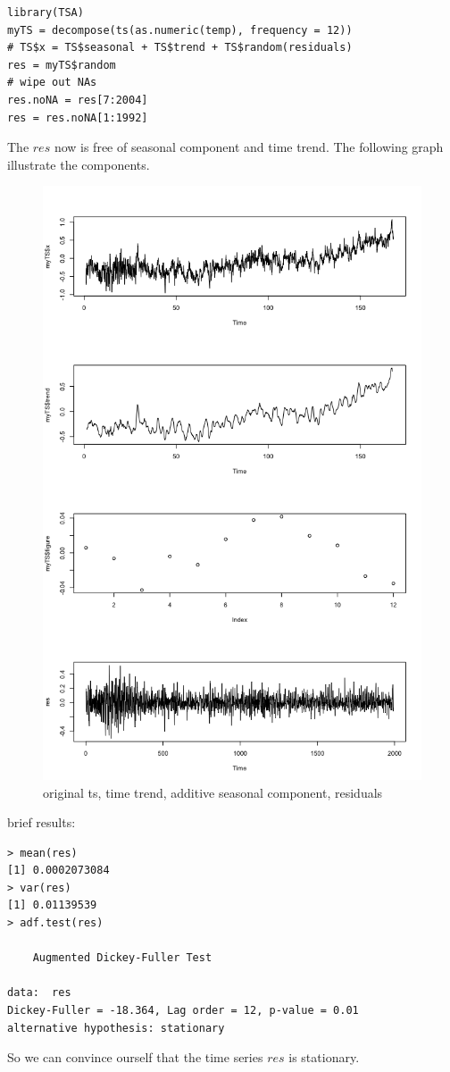 \documentclass[a4paper, 11pt]{article}
\begin{document}
\begin{verbatim}
library(TSA)
myTS = decompose(ts(as.numeric(temp), frequency = 12))
# TS$x = TS$seasonal + TS$trend + TS$random(residuals) 
res = myTS$random
# wipe out NAs
res.noNA = res[7:2004] 
res = res.noNA[1:1992]
\end{verbatim}
\indent The $res$ now is free of seasonal component and time trend. The following graph illustrate the components.
\begin{figure}[H]
\centering
\caption{original ts, time trend, additive seasonal component, residuals}
\includegraphics[scale=.60]{component.png}
\end{figure}

\indent brief results:
\begin{verbatim}
> mean(res)
[1] 0.0002073084
> var(res)
[1] 0.01139539
> adf.test(res)

	Augmented Dickey-Fuller Test

data:  res
Dickey-Fuller = -18.364, Lag order = 12, p-value = 0.01
alternative hypothesis: stationary
\end{verbatim}
\indent So we can convince ourself that the time series $res$ is stationary.
\end{document}
